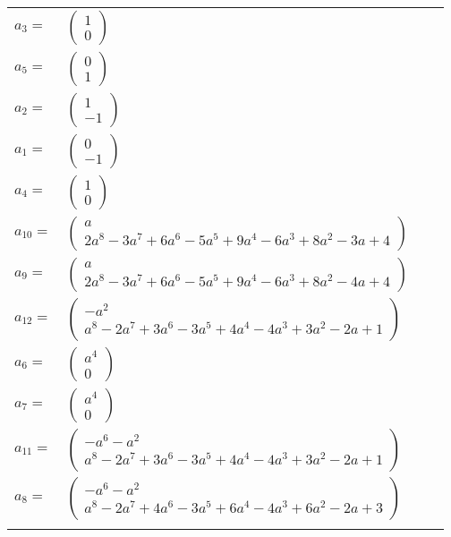 \documentclass[1p]{elsarticle_modified}
\theoremstyle{definition}
\begin{document}
\begin{tabular}{m{7pt} m{180pt} m{7pt} m{180pt} }
\flushright $a_{3}=$&$\begin{pmatrix}1\\0\end{pmatrix}$ \\
\flushright $a_{5}=$&$\begin{pmatrix}0\\1\end{pmatrix}$ \\
\flushright $a_{2}=$&$\begin{pmatrix}1\\-1\end{pmatrix}$ \\
\flushright $a_{1}=$&$\begin{pmatrix}0\\-1\end{pmatrix}$ \\
\flushright $a_{4}=$&$\begin{pmatrix}1\\0\end{pmatrix}$ \\
\flushright $a_{10}=$&$\begin{pmatrix}a\\2 a^8-3 a^7+6 a^6-5 a^5+9 a^4-6 a^3+8 a^2-3 a+4\end{pmatrix}$ \\
\flushright $a_{9}=$&$\begin{pmatrix}a\\2 a^8-3 a^7+6 a^6-5 a^5+9 a^4-6 a^3+8 a^2-4 a+4\end{pmatrix}$ \\
\flushright $a_{12}=$&$\begin{pmatrix}- a^2\\a^8-2 a^7+3 a^6-3 a^5+4 a^4-4 a^3+3 a^2-2 a+1\end{pmatrix}$ \\
\flushright $a_{6}=$&$\begin{pmatrix}a^4\\0\end{pmatrix}$ \\
\flushright $a_{7}=$&$\begin{pmatrix}a^4\\0\end{pmatrix}$ \\
\flushright $a_{11}=$&$\begin{pmatrix}- a^6- a^2\\a^8-2 a^7+3 a^6-3 a^5+4 a^4-4 a^3+3 a^2-2 a+1\end{pmatrix}$ \\
\flushright $a_{8}=$&$\begin{pmatrix}- a^6- a^2\\a^8-2 a^7+4 a^6-3 a^5+6 a^4-4 a^3+6 a^2-2 a+3\end{pmatrix}$\\&\end{tabular}
\end{document}
